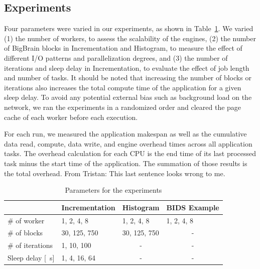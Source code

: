 \documentclass[conference]{IEEEtran}
\newcommand{\TG}[1]{\color{cyan}From Tristan: #1 \color{black}}
\begin{document}
\subsection{Experiments}

Four parameters were varied in our experiments, as shown in
Table~\ref{tab:param}. We varied (1) the number of workers, to assess the
scalability of the engines, (2) the number of BigBrain blocks in
Incrementation and Histogram, to measure the effect of different I/O patterns
and parallelization degrees, and (3) the number of iterations and sleep
delay in Incrementation, to evaluate the effect of job length and number of
tasks.
It should be noted that increasing the number of blocks or iterations also
increases the total compute time of the application for a given sleep
delay. To avoid any potential external bias such as background load on the
network, we ran the experiments in a randomized order and cleared the page
cache of each worker before each execution.

For each run, we measured the application makespan as well as the cumulative 
data read, compute, data write, and engine overhead times across all application
tasks. 
The overhead calculation for each CPU is the end time of its last processed task
minus the start time of the application. The summation of those results is the
total overhead. \TG{This last sentence looks wrong to me.}


\begin{table}[!t]
    \renewcommand{\arraystretch}{1.3}
    \caption{Parameters for the experiments}\label{tab:param}
    \centering
    \begin{tabular*}{\columnwidth}{llll}
    \hline
                        & Incrementation & Histogram             & BIDS Example          \\ \hline
    \# of worker        & 1, 2, 4, 8     & 1, 2, 4, 8            & 1, 2, 4, 8            \\
    \# of blocks        & 30, 125, 750   & 30, 125, 750          & \multicolumn{1}{c}{-} \\
    \# of iterations    & 1, 10, 100     & \multicolumn{1}{c}{-} & \multicolumn{1}{c}{-} \\
    Sleep delay {[}\SI{}{\second}{]} & 1, 4, 16, 64   & \multicolumn{1}{c}{-} & \multicolumn{1}{c}{-} \\ \hline
    \end{tabular*}
    \end{table}
\end{document}
